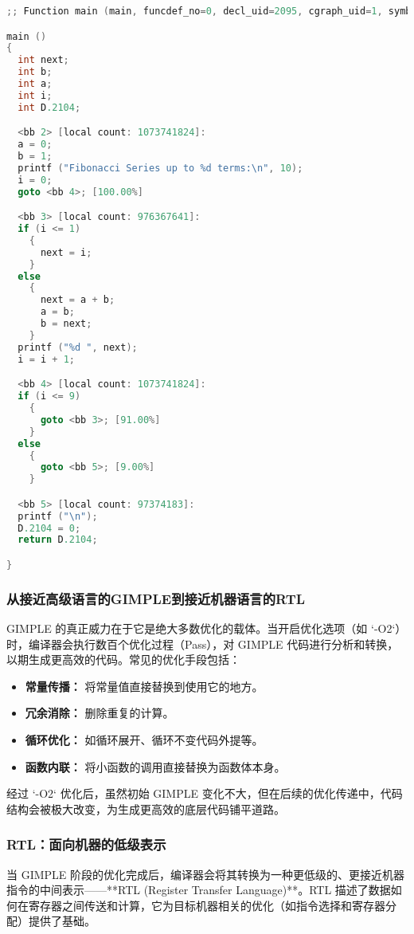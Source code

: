 \documentclass[a4paper]{article}
\begin{document}
\begin{lstlisting}[language=C, caption={fibonacci.c.004t.gimple}]
;; Function main (main, funcdef_no=0, decl_uid=2095, cgraph_uid=1, symbol_order=0)

main ()
{
  int next;
  int b;
  int a;
  int i;
  int D.2104;

  <bb 2> [local count: 1073741824]:
  a = 0;
  b = 1;
  printf ("Fibonacci Series up to %d terms:\n", 10);
  i = 0;
  goto <bb 4>; [100.00%]

  <bb 3> [local count: 976367641]:
  if (i <= 1)
    {
      next = i;
    }
  else
    {
      next = a + b;
      a = b;
      b = next;
    }
  printf ("%d ", next);
  i = i + 1;

  <bb 4> [local count: 1073741824]:
  if (i <= 9)
    {
      goto <bb 3>; [91.00%]
    }
  else
    {
      goto <bb 5>; [9.00%]
    }

  <bb 5> [local count: 97374183]:
  printf ("\n");
  D.2104 = 0;
  return D.2104;

}
\end{lstlisting}

\subsubsection{从接近高级语言的GIMPLE到接近机器语言的RTL}

GIMPLE 的真正威力在于它是绝大多数优化的载体。当开启优化选项（如 `-O2`）时，编译器会执行数百个优化过程（Pass），对 GIMPLE 代码进行分析和转换，以期生成更高效的代码。常见的优化手段包括：
\begin{itemize}
    \item \textbf{常量传播：} 将常量值直接替换到使用它的地方。
    \item \textbf{冗余消除：} 删除重复的计算。
    \item \textbf{循环优化：} 如循环展开、循环不变代码外提等。
    \item \textbf{函数内联：} 将小函数的调用直接替换为函数体本身。
\end{itemize}
经过 `-O2` 优化后，虽然初始 GIMPLE 变化不大，但在后续的优化传递中，代码结构会被极大改变，为生成更高效的底层代码铺平道路。

\subsubsection{RTL：面向机器的低级表示}

当 GIMPLE 阶段的优化完成后，编译器会将其转换为一种更低级的、更接近机器指令的中间表示——**RTL (Register Transfer Language)**。RTL 描述了数据如何在寄存器之间传送和计算，它为目标机器相关的优化（如指令选择和寄存器分配）提供了基础。
\end{document}
